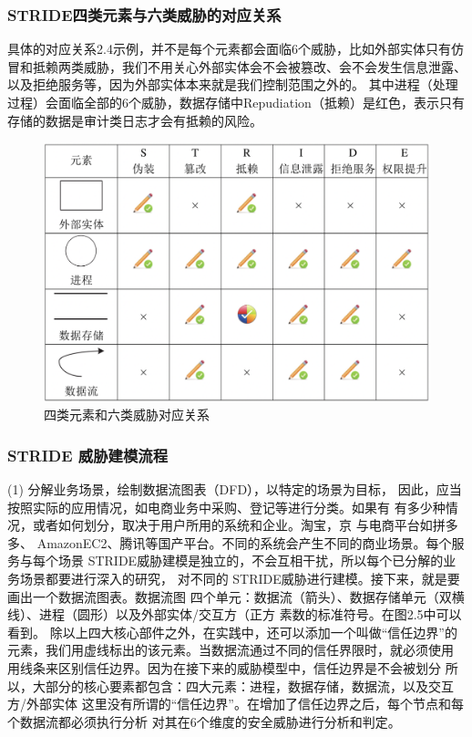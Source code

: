 

\subsubsection{STRIDE四类元素与六类威胁的对应关系}

具体的对应关系2.4示例，并不是每个元素都会面临6个威胁，比如外部实体只有仿冒和抵赖两类威胁，我们不用关心外部实体会不会被篡改、会不会发生信息泄露、以及拒绝服务等，因为外部实体本来就是我们控制范围之外的。
其中进程（处理过程）会面临全部的6个威胁，数据存储中Repudiation（抵赖）是红色，表示只有存储的数据是审计类日志才会有抵赖的风险。
\begin{figure}
    \centering
    \includegraphics[scale=0.6]{resources/img/i77.png}
    \caption{四类元素和六类威胁对应关系}
  \end{figure}

\subsubsection{STRIDE 威胁建模流程}
(1) 分解业务场景，绘制数据流图表（DFD），以特定的场景为目标，
因此，应当按照实际的应用情况，如电商业务中采购、登记等进行分类。如果有
有多少种情况，或者如何划分，取决于用户所用的系统和企业。淘宝，京
与电商平台如拼多多、 AmazonEC2、腾讯等国产平台。不同的系统会产生不同的商业场景。每个服务与每个场景
STRIDE威胁建模是独立的，不会互相干扰，所以每个已分解的业务场景都要进行深入的研究，
对不同的 STRIDE威胁进行建模。接下来，就是要画出一个数据流图表。数据流图
四个单元：数据流（箭头）、数据存储单元（双横线）、进程（圆形）以及外部实体/交互方（正方
素数的标准符号。在图2.5中可以看到。
除以上四大核心部件之外，在实践中，还可以添加一个叫做“信任边界”的元素，我们用虚线标出的该元素。当数据流通过不同的信任界限时，就必须使用
用线条来区别信任边界。因为在接下来的威胁模型中，信任边界是不会被划分
所以，大部分的核心要素都包含：四大元素：进程，数据存储，数据流，以及交互方/外部实体
这里没有所谓的“信任边界”。在增加了信任边界之后，每个节点和每个数据流都必须执行分析
对其在6个维度的安全威胁进行分析和判定。

